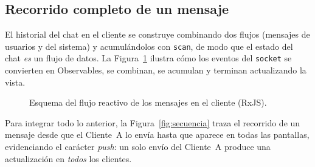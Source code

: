 \documentclass[12pt,a4paper]{article}
\begin{document}
\subsection{Recorrido completo de un mensaje}

El historial del chat en el cliente se construye combinando dos flujos (mensajes de usuarios y del sistema) y acumulándolos con \texttt{scan}, de modo que el estado del chat \emph{es} un flujo de datos. La Figura~\ref{fig:streams} ilustra cómo los eventos del \texttt{socket} se convierten en Observables, se combinan, se acumulan y terminan actualizando la vista.

\begin{figure}[H]
\centering
{}
\caption{Esquema del flujo reactivo de los mensajes en el cliente (RxJS).}
\label{fig:streams}
\end{figure}

Para integrar todo lo anterior, la Figura~\ref{fig:secuencia} traza el recorrido de un mensaje desde que el Cliente~A lo envía hasta que aparece en todas las pantallas, evidenciando el carácter \textit{push}: un solo envío del Cliente~A produce una actualización en \emph{todos} los clientes.
\end{document}
